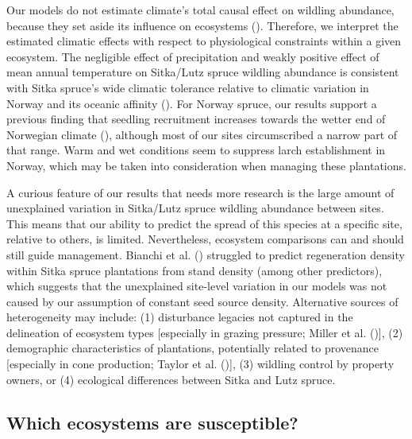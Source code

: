 \documentclass[
]{article}
\begin{document}
Our models do not estimate climate's total causal effect on wildling abundance,
because they set aside its influence on ecosystems
(). Therefore, we interpret the estimated
climatic effects with respect to physiological constraints within a given
ecosystem. The negligible effect of precipitation and weakly positive effect of
mean annual temperature on Sitka/Lutz spruce wildling abundance is consistent
with Sitka spruce's wide climatic tolerance relative to climatic variation in
Norway and its oceanic affinity (). For
Norway spruce, our results support a previous finding that seedling recruitment
increases towards the wetter end of Norwegian climate
(), although most of our sites
circumscribed a narrow part of that range. Warm and wet conditions seem to
suppress larch establishment in Norway, which may be taken into consideration
when managing these plantations.

A curious feature of our results that needs more research is the large amount of
unexplained variation in Sitka/Lutz spruce wildling abundance between sites.
This means that our ability to predict the spread of this species at a specific
site, relative to others, is limited. Nevertheless, ecosystem comparisons can
and should still guide management. Bianchi et al.
() struggled to predict regeneration density
within Sitka spruce plantations from stand density (among other predictors),
which suggests that the unexplained site-level variation in our models was not
caused by our assumption of constant seed source density. Alternative sources of
heterogeneity may include: (1) disturbance legacies not captured in the
delineation of ecosystem types {[}especially in grazing pressure;
Miller et al. (){]}, (2) demographic characteristics of
plantations, potentially related to provenance {[}especially in cone production;
Taylor et al. (){]}, (3) wildling control by property owners, or
(4) ecological differences between Sitka and Lutz spruce.

\subsection{Which ecosystems are susceptible?}\label{which-ecosystems-are-susceptible}
\end{document}
